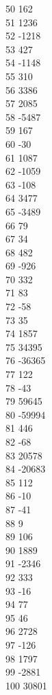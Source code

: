{ 50	162 \\
 51	1236 \\
 52	-1218 \\
 53	427 \\
 54	-1148 \\
 55	310 \\
 56	3386 \\
 57	2085 \\
 58	-5487 \\
 59	167 \\
 60	-30 \\
 61	1087 \\
 62	-1059 \\
 63	-108 \\
 64	3477 \\
 65	-3489 \\
 66	79 \\
 67	34 \\
 68	482 \\
 69	-926 \\
 70	332 \\
 71	83 \\
 72	-58 \\
 73	35 \\
 74	1857 \\
 75	34395 \\
 76	-36365 \\
 77	122 \\
 78	-43 \\
 79	59645 \\
 80	-59994 \\
 81	446 \\
 82	-68 \\
 83	20578 \\
 84	-20683 \\
 85	112 \\
 86	-10 \\
 87	-41 \\
 88	9 \\
 89	106 \\
 90	1889 \\
 91	-2346 \\
 92	333 \\
 93	-16 \\
 94	77 \\
 95	46 \\
 96	2728 \\
 97	-126 \\
 98	1797 \\
 99	-2881 \\
 100	30801 \\
}
